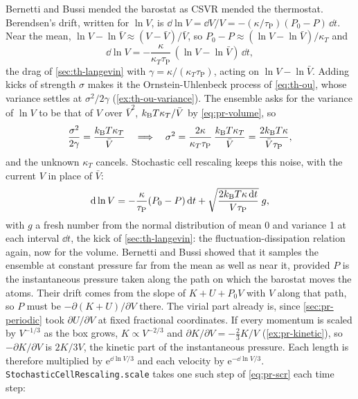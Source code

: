 Bernetti and Bussi mended the barostat as CSVR mended the
thermostat\cite{Bernetti2020}. Berendsen's drift, written for $\ln V$, is
$\dd\ln V = \dd V/V = -(\kappa/\tau_{\mathrm P})(P_0 - P)\,\dd t$. Near the
mean, $\ln V - \ln\bar V \approx (V - \bar V)/\bar V$, so $P_0 - P \approx
(\ln V - \ln\bar V)/\kappa_T$ and
\begin{equation*}
   \dd\ln V = -\frac{\kappa}{\kappa_T\tau_{\mathrm P}}\,(\ln V - \ln\bar V)
   \,\dd t ,
\end{equation*}
the drag of \cref{sec:th-langevin} with $\gamma = \kappa/(\kappa_T
\tau_{\mathrm P})$, acting on $\ln V - \ln\bar V$. Adding kicks of strength
$\sigma$ makes it the Ornstein-Uhlenbeck process of \cref{eq:th-ou},
whose variance settles at $\sigma^2/2\gamma$ (\cref{ex:th-ou-variance}).
The ensemble asks for the variance of $\ln V$ to be that of $V$ over
$\bar V^2$, $k_{\mathrm{B}} T\kappa_T/\bar V$ by \cref{eq:pr-volume}, so
\begin{equation*}
   \frac{\sigma^2}{2\gamma} = \frac{k_{\mathrm{B}} T\kappa_T}{\bar V}
   \quad\Longrightarrow\quad
   \sigma^2 = \frac{2\kappa}{\kappa_T\tau_{\mathrm P}}\,
   \frac{k_{\mathrm{B}} T\kappa_T}{\bar V} = \frac{2k_{\mathrm{B}} T\kappa}{\bar V\tau_{\mathrm P}} ,
\end{equation*}
and the unknown $\kappa_T$ cancels. Stochastic cell rescaling keeps this
noise, with the current $V$ in place of $\bar V$:
\begin{equation}
   \mathrm{d}\ln V = -\frac{\kappa}{\tau_{\mathrm P}}(P_0 - P)\,\mathrm{d} t
   + \sqrt{\frac{2k_{\mathrm{B}} T\kappa\,\mathrm{d} t}{V\tau_{\mathrm P}}}\;g ,
   \label{eq:pr-scr}
\end{equation}
with $g$ a fresh number from the normal distribution of mean 0 and
variance 1 at each interval $\dd t$, the kick of \cref{sec:th-langevin}:
the fluctuation-dissipation relation again, now for the volume. Bernetti
and Bussi showed that it samples the ensemble at constant pressure far
from the mean as well as near it\cite{Bernetti2020}, provided $P$ is the
instantaneous pressure taken along the path on which the barostat moves
the atoms. Their drift comes from the slope of $K + U + P_0V$ with $V$
along that path, so $P$ must be $-\partial(K + U)/\partial V$ there. The
virial part already is, since \cref{sec:pr-periodic} took $\partial U/
\partial V$ at fixed fractional coordinates. If every momentum is scaled by
$V^{-1/3}$ as the box grows, $K \propto V^{-2/3}$ and $\partial K/\partial V
= -\frac23K/V$ (\cref{ex:pr-kinetic}), so $-\partial K/\partial V$ is $2K/3V$,
the kinetic part of the instantaneous pressure. Each length is therefore
multiplied by $\mathrm{e}^{\dd\ln V/3}$ and each velocity by
$\mathrm{e}^{-\dd\ln V/3}$. \texttt{StochasticCellRescaling.scale} takes
one such step of \cref{eq:pr-scr} each time step:


